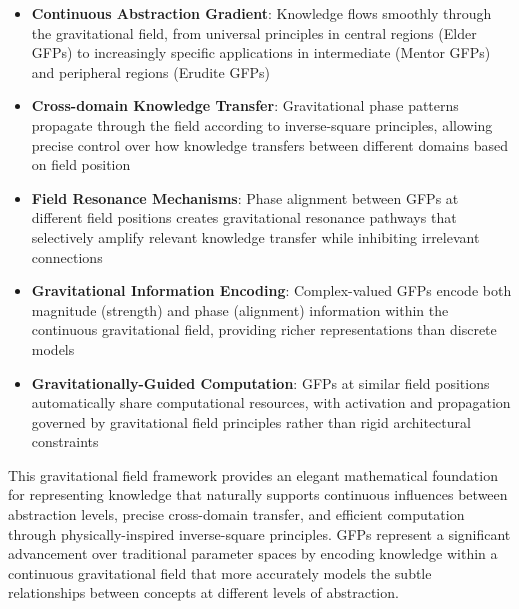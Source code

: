 \begin{itemize}
    \item \textbf{Continuous Abstraction Gradient}: Knowledge flows smoothly through the gravitational field, from universal principles in central regions (Elder GFPs) to increasingly specific applications in intermediate (Mentor GFPs) and peripheral regions (Erudite GFPs)
    
    \item \textbf{Cross-domain Knowledge Transfer}: Gravitational phase patterns propagate through the field according to inverse-square principles, allowing precise control over how knowledge transfers between different domains based on field position
    
    \item \textbf{Field Resonance Mechanisms}: Phase alignment between GFPs at different field positions creates gravitational resonance pathways that selectively amplify relevant knowledge transfer while inhibiting irrelevant connections
    
    \item \textbf{Gravitational Information Encoding}: Complex-valued GFPs encode both magnitude (strength) and phase (alignment) information within the continuous gravitational field, providing richer representations than discrete models
    
    \item \textbf{Gravitationally-Guided Computation}: GFPs at similar field positions automatically share computational resources, with activation and propagation governed by gravitational field principles rather than rigid architectural constraints
\end{itemize}

This gravitational field framework provides an elegant mathematical foundation for representing knowledge that naturally supports continuous influences between abstraction levels, precise cross-domain transfer, and efficient computation through physically-inspired inverse-square principles. GFPs represent a significant advancement over traditional parameter spaces by encoding knowledge within a continuous gravitational field that more accurately models the subtle relationships between concepts at different levels of abstraction.